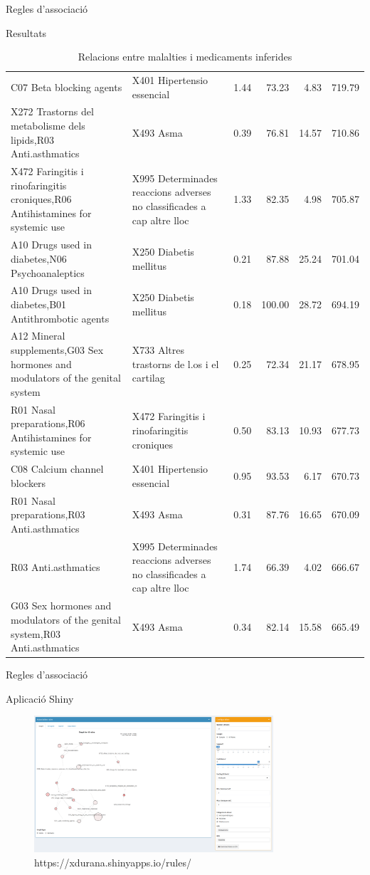 \documentclass[ignorenonframetext,]{beamer}
\begin{document}
\begin{frame}{Regles d'associació}
\begin{block}{Resultats}
\begin{table}[ht]
{\begin{tabular}{llrrrr}
  C07 Beta blocking agents & X401 Hipertensio essencial & 1.44 & 73.23 & 4.83 & 719.79 \\ 
  X272 Trastorns del metabolisme dels lipids,R03 Anti.asthmatics & X493 Asma & 0.39 & 76.81 & 14.57 & 710.86 \\ 
  X472 Faringitis i rinofaringitis croniques,R06 Antihistamines for systemic use & X995 Determinades reaccions adverses no classificades a cap altre lloc & 1.33 & 82.35 & 4.98 & 705.87 \\ 
  A10 Drugs used in diabetes,N06 Psychoanaleptics & X250 Diabetis mellitus & 0.21 & 87.88 & 25.24 & 701.04 \\ 
  A10 Drugs used in diabetes,B01 Antithrombotic agents & X250 Diabetis mellitus & 0.18 & 100.00 & 28.72 & 694.19 \\ 
  A12 Mineral supplements,G03 Sex hormones and modulators of the genital system & X733 Altres trastorns de l.os i el cartilag & 0.25 & 72.34 & 21.17 & 678.95 \\ 
  R01 Nasal preparations,R06 Antihistamines for systemic use & X472 Faringitis i rinofaringitis croniques & 0.50 & 83.13 & 10.93 & 677.73 \\ 
  C08 Calcium channel blockers & X401 Hipertensio essencial & 0.95 & 93.53 & 6.17 & 670.73 \\ 
  R01 Nasal preparations,R03 Anti.asthmatics & X493 Asma & 0.31 & 87.76 & 16.65 & 670.09 \\ 
  R03 Anti.asthmatics & X995 Determinades reaccions adverses no classificades a cap altre lloc & 1.74 & 66.39 & 4.02 & 666.67 \\ 
  G03 Sex hormones and modulators of the genital system,R03 Anti.asthmatics & X493 Asma & 0.34 & 82.14 & 15.58 & 665.49 \\ 
   \hline
\end{tabular}
}
\caption{Relacions entre malalties i medicaments inferides} 
\end{table}

\end{block}

\end{frame}

\begin{frame}{Regles d'associació}

\begin{block}{Aplicació Shiny}

\begin{figure}[v]
  \mbox{\includegraphics[height=2in]{images/medsnrules.png}}
  \caption{https://xdurana.shinyapps.io/rules/}\label{fig:medsnrules}
\end{figure}

\end{block}

\end{frame}
\end{document}
